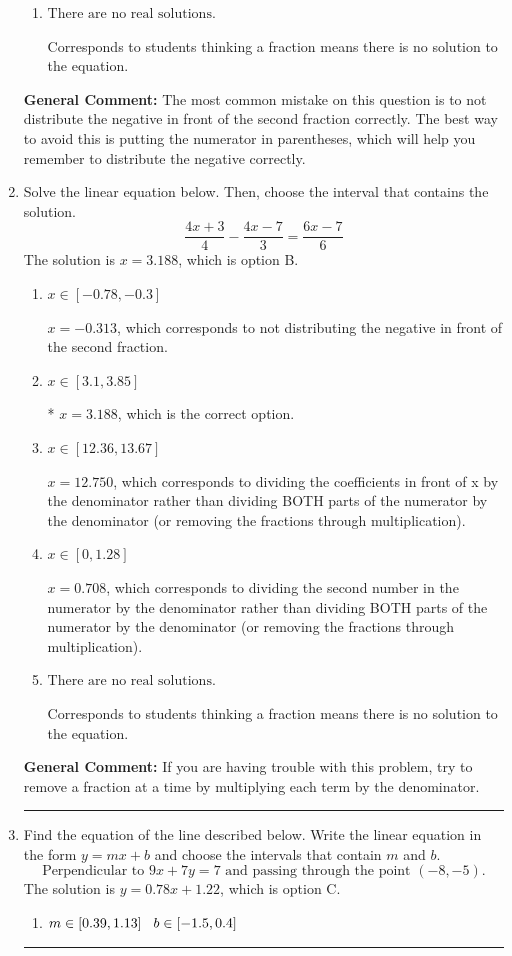 \documentclass{extbook}[14pt]
\newcommand{\litem}[1]{\item #1

\rule{\textwidth}{0.4pt}}
\begin{document}
\begin{enumerate}
{\begin{enumerate}[label=\Alph*.]
$x = 0.719$, which corresponds to getting the negative of the actual solution.
\item \( \text{There are no real solutions.} \)

Corresponds to students thinking a fraction means there is no solution to the equation.
\end{enumerate}

\textbf{General Comment:} The most common mistake on this question is to not distribute the negative in front of the second fraction correctly. The best way to avoid this is putting the numerator in parentheses, which will help you remember to distribute the negative correctly.
}
\litem{
Solve the linear equation below. Then, choose the interval that contains the solution.
\[ \frac{4x + 3}{4} - \frac{4x -7}{3} = \frac{6x -7}{6} \]The solution is \( x = 3.188 \), which is option B.\begin{enumerate}[label=\Alph*.]
\item \( x \in [-0.78, -0.3] \)

 $x = -0.313$, which corresponds to not distributing the negative in front of the second fraction.
\item \( x \in [3.1, 3.85] \)

* $x = 3.188$, which is the correct option.
\item \( x \in [12.36, 13.67] \)

 $x = 12.750$, which corresponds to dividing the coefficients in front of x by the denominator rather than dividing BOTH parts of the numerator by the denominator (or removing the fractions through multiplication).
\item \( x \in [0, 1.28] \)

 $x = 0.708$, which corresponds to dividing the second number in the numerator by the denominator rather than dividing BOTH parts of the numerator by the denominator (or removing the fractions through multiplication).
\item \( \text{There are no real solutions.} \)

Corresponds to students thinking a fraction means there is no solution to the equation.
\end{enumerate}

\textbf{General Comment:} If you are having trouble with this problem, try to remove a fraction at a time by multiplying each term by the denominator.
}
\litem{
Find the equation of the line described below. Write the linear equation in the form $ y=mx+b $ and choose the intervals that contain $m$ and $b$.
\[ \text{Perpendicular to } 9 x + 7 y = 7 \text{ and passing through the point } (-8, -5). \]The solution is \( y = 0.78x + 1.22 \), which is option C.\begin{enumerate}[label=\Alph*.]
\item \( m \in [0.39, 1.13] \hspace*{3mm} b \in [-1.5, 0.4] \)


\end{enumerate}}
\end{enumerate}
\end{document}
